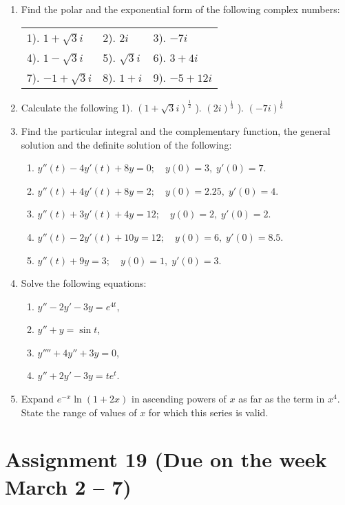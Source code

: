 \documentclass[12pt]{article} %
\theoremstyle{definition} %
\begin{document}
\begin{enumerate}
\item Find the polar and the exponential form of the following complex numbers:

\begin{tabular}{lll}
1). $1+\sqrt{3}i$ & 2). $2i$ & 3). $-7i$\\
4). $1-\sqrt{3}i$ & 5). $\sqrt{3}i$ & 6). $3+4i$\\
7). $-1+\sqrt{3}i$ & 8). $1+i$ & 9). $-5+12i$
\end{tabular}

\item Calculate the following
1). $(1+\sqrt{3}i)^{\frac12}$ ). $(2i)^{\frac13}$ ). $(-7i)^{\frac16}$

\item Find the particular integral and the complementary function, the general solution and the definite solution of the following:
\begin{enumerate}
\item $y''(t)-4y'(t)+8y=0;\quad y(0)=3,\; y'(0)=7$.
\item $y''(t)+4y'(t)+8y=2;\quad y(0)=2.25,\; y'(0)=4$.
\item $y''(t)+3y'(t)+4y=12;\quad y(0)=2,\; y'(0)=2$.
\item $y''(t)-2y'(t)+10y=12;\quad y(0)=6,\; y'(0)=8.5$.
\item $y''(t)+9y=3;\quad y(0)=1,\; y'(0)=3$.
\end{enumerate}


\item Solve the following equations:
\begin{enumerate}
\item $y''-2y'-3y=e^{4t}$,
\item $y''+y=\sin t$,
\item $y''''+4y''+3y=0$,
\item $y''+2y'-3y=te^t$.
\end{enumerate}
\item Expand $e^{-x}\ln(1+2x)$ in ascending powers of $x$ as far as the term in $x^4$. State the range of values of $x$ for which this series is valid.
\end{enumerate}




\section{Assignment 19 (Due on the week March 2 – 7)}
\end{document}

